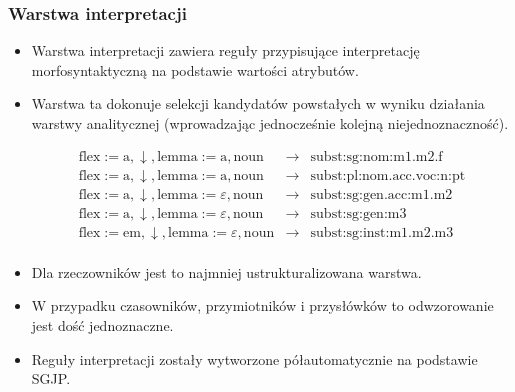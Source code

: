 \documentclass{beamer}
\begin{document}
\begin{frame}
\frametitle{Warstwa interpretacji}
\begin{itemize}
\item Warstwa interpretacji zawiera reguły przypisujące interpretację morfosyntaktyczną na podstawie wartości atrybutów.
\item Warstwa ta dokonuje selekcji kandydatów powstałych w wyniku działania warstwy analitycznej (wprowadzając jednocześnie kolejną niejednoznaczność).
\begin{scriptsize}\[
\begin{array}{lll}
\text{flex}:=\text{a}, \downarrow, \text{lemma}:=\text{a}, \text{noun} & \rightarrow & \text{subst:sg:nom:m1.m2.f}\\
\text{flex}:=\text{a}, \downarrow, \text{lemma}:=\text{a}, \text{noun} & \rightarrow & \text{subst:pl:nom.acc.voc:n:pt}\\
\text{flex}:=\text{a}, \downarrow, \text{lemma}:=\text{$\varepsilon$}, \text{noun} & \rightarrow & \text{subst:sg:gen.acc:m1.m2}\\
\text{flex}:=\text{a}, \downarrow, \text{lemma}:=\text{$\varepsilon$}, \text{noun} & \rightarrow & \text{subst:sg:gen:m3}\\
\text{flex}:=\text{em}, \downarrow, \text{lemma}:=\text{$\varepsilon$}, \text{noun} & \rightarrow & \text{subst:sg:inst:m1.m2.m3}\\
\end{array} 
\]\end{scriptsize}
\item Dla rzeczowników jest to najmniej ustrukturalizowana warstwa.
\item W przypadku czasowników, przymiotników i przysłówków to odwzorowanie jest dość jednoznaczne.
\item Reguły interpretacji zostały wytworzone półautomatycznie na podstawie SGJP.
\end{itemize}
\end{frame}
\end{document}
